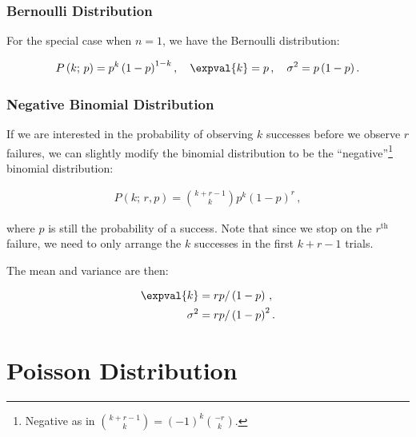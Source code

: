 \subsubsection{Bernoulli Distribution}
\label{stats:binomial:bernoulli}

For the special case when $n=1$, we have the Bernoulli distribution:

\begin{equation}\label{eq:stats:bernoulli}
P\left(k;\,p\right) = p^{k} \left(1-p\right)^{1-k}, \quad \expval{k} = p\,, \quad \sigma^{2} = p\left(1-p\right).
\end{equation}

\subsubsection{Negative Binomial Distribution}
\label{stats:binomial:negative}

If we are interested in the probability of
observing $k$ successes before we observe $r$ failures,
we can slightly modify the binomial distribution to be
the ``negative''\footnote{Negative as in $\binom{k+r-1}{k} = \left(-1\right)^{k} \binom{-r}{k}$.} binomial distribution:

\begin{subequations}\label{eq:stats:binomial:neg:P}
\begin{align}
P\left(k;\,r,p\right) = \binom{k+r-1}{k} p^{k} \left(1-p\right)^{r}\,,
\end{align}
\end{subequations}

\noindent where $p$ is still the probability of a success.
Note that since we stop on the $r^{\text{th}}$ failure,
we need to only arrange the $k$ successes in the first $k+r-1$ trials.

The mean and variance are then:

\begin{subequations}\label{eq:stats:binomial:neg:mean_variance}
\begin{align}
\expval{k} &= r p / \left(1-p\right)\,, \label{eq:stats:binomial:neg:mean} \\
\sigma^{2} &= r p / \left(1-p\right)^{2}. \label{eq:stats:binomial:neg:variance}
\end{align}
\end{subequations}

\section{Poisson Distribution}
\label{stats:poisson}


